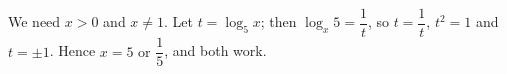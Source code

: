 We need $x>0$ and $x\ne1$. Let $t=\log_5x$; then $\log_x5=\dfrac1t$, so $t=\dfrac1t$, $t^2=1$ and $t=\pm1$. Hence $x=\boxed{5\text{ or }\dfrac15}$, and both work.
